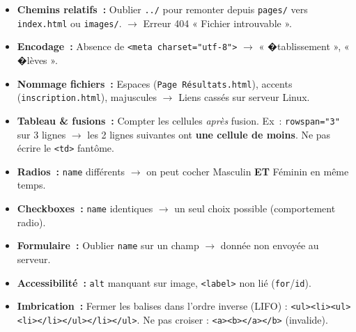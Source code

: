 \documentclass[11pt]{article}
\begin{document}
\begin{attention}
\begin{itemize}
\item \textbf{Chemins relatifs~:} Oublier \texttt{../} pour remonter depuis \texttt{pages/} vers \texttt{index.html} ou \texttt{images/}. $\rightarrow$ Erreur 404 « Fichier introuvable ».
\item \textbf{Encodage~:} Absence de \texttt{<meta charset="utf-8">} $\rightarrow$ « �tablissement », « �lèves ».
\item \textbf{Nommage fichiers~:} Espaces (\texttt{Page Résultats.html}), accents (\texttt{inscription.html}), majuscules $\rightarrow$ Liens cassés sur serveur Linux.
\item \textbf{Tableau \& fusions~:} Compter les cellules \emph{après} fusion. Ex~: \texttt{rowspan="3"} sur 3 lignes $\rightarrow$ les 2 lignes suivantes ont \textbf{une cellule de moins}. Ne pas écrire le \texttt{<td>} fantôme.
\item \textbf{Radios~:} \texttt{name} différents $\rightarrow$ on peut cocher Masculin \textbf{ET} Féminin en même temps.
\item \textbf{Checkboxes~:} \texttt{name} identiques $\rightarrow$ un seul choix possible (comportement radio).
\item \textbf{Formulaire~:} Oublier \texttt{name} sur un champ $\rightarrow$ donnée non envoyée au serveur.
\item \textbf{Accessibilité~:} \texttt{alt} manquant sur image, \texttt{<label>} non lié (\texttt{for}/\texttt{id}).
\item \textbf{Imbrication~:} Fermer les balises dans l'ordre inverse (LIFO) : \texttt{<ul><li><ul><li></li></ul></li></ul>}. Ne pas croiser : \texttt{<a><b></a></b>} (invalide).
\end{itemize}
\end{attention}
\end{document}
